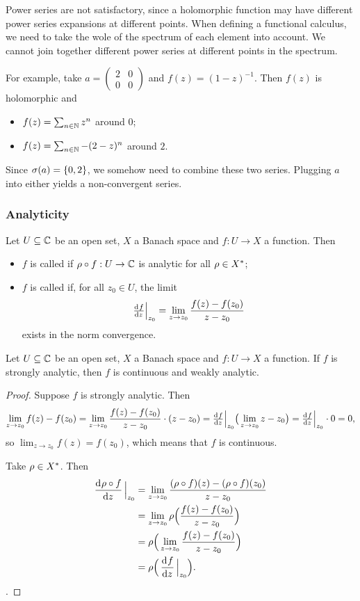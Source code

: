 \begin{example}
Power series are not satisfactory, since a holomorphic function may have different power series expansions at different points. When defining a functional calculus, we need to take the wole of the spectrum of each element into account. We cannot join together different power series at different points in the spectrum.

For example, take $a = \begin{pmatrix}
2 & 0 \\ 0 & 0
\end{pmatrix}$ and $f(z) = (1-z)^{-1}$. Then $f(z)$ is holomorphic and
\begin{itemize}
\item $f(z) = \sum_{n\in\mathbb{N}}z^n$ around $0$;
\item $f(z) = \sum_{n\in\mathbb{N}}-(2 - z)^n$ around $2$.
\end{itemize}
Since $\sigma(a) = \{0,2\}$, we somehow need to combine these two series. Plugging $a$ into either yields a non-convergent series.
\end{example}

\subsubsection{Analyticity}
\begin{definition}
Let $U\subseteq \mathbb{C}$ be an open set, $X$ a Banach space and $f: U\to X$ a function. Then
\begin{itemize}
\item $f$ is called  if $\rho\circ f: U\to \mathbb{C}$ is analytic for all $\rho\in {X}^*$;
\item $f$ is called  if, for all $z_0 \in U$, the limit
\[ \od{f}{z}\Big|_{z_0} = \lim_{z\to z_0} \frac{f(z) - f(z_0)}{z-z_0} \]
exists in the norm convergence.
\end{itemize}
\end{definition}

\begin{lemma}
Let $U\subseteq \mathbb{C}$ be an open set, $X$ a Banach space and $f: U\to X$ a function. If $f$ is strongly analytic, then $f$ is continuous and weakly analytic.
\end{lemma}
\begin{proof}
Suppose $f$ is strongly analytic. Then
\[ \lim_{z\to z_0} f(z) - f(z_0) =  \lim_{z\to z_0}\frac{f(z) - f(z_0)}{z-z_0}\cdot (z-z_0) = \od{f}{z}\Big|_{z_0} \big(\lim_{z\to z_0}z-z_0\big) = \od{f}{z}\Big|_{z_0}\cdot 0 = 0, \]
so $\lim_{z\to z_0} f(z) = f(z_0)$, which means that $f$ is continuous.

Take $\rho\in {X}^*$. Then
\begin{align*}
\mathinner{ \dfrac{\operatorname{d \!}{^{}}\rho\circ f}{\operatorname{d \!}{{z}^{}}} }\Big|_{z_0} &= \lim_{z\to z_0} \frac{(\rho \circ f)(z) - (\rho \circ f)(z_0)}{z-z_0} \\
&= \lim_{z\to z_0} \rho\Big(\frac{f(z) - f(z_0)}{z-z_0}\Big) \\
&= \rho\Big(\lim_{z\to z_0}\frac{f(z) - f(z_0)}{z-z_0}\Big) \\
&= \rho\Big(\mathinner{ \dfrac{\operatorname{d \!}{^{}}f}{\operatorname{d \!}{{z}^{}}} }\Big|_{z_0}\Big).
\end{align*}.
\end{proof}

